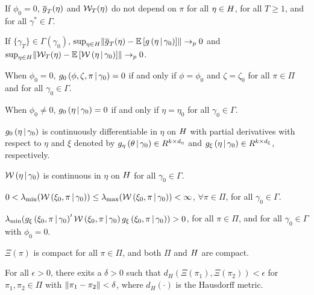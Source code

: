 \documentclass[11pt, letterpaper, twoside, final]{article}
\begin{document}
\begin{appendices}
    \begin{assump}[GMM 1]\label{ass:GMM1}
    \begin{assumplist}
        \item If $\phi_0=0$, $\sampmom(\eta)$ and $\W_{T}(\eta)$ do not depend on $\pi$ for all $\eta \in \Eta$,
            for all $T \geq 1$, and for all $\gamma^{*}\in \Gamma.$ 
            \label{ass:GMM1a}
        \item If $\lbrace \gamma_{T} \rbrace \in \Gamma\left(\gamma_0\right)$, $\sup_{\eta \in \Eta}
            \norm*{\sampmom(\eta) - \E\left[g\left(\eta \mvert \gamma_0\right)\right]} \pto 0$ and $\sup_{\eta
            \in \Eta} \norm{\W_{T}(\eta)-\E\left[\W\left(\eta \mvert \gamma_0\right)\right]} \pto 0$.
            \label{ass:GMM1b}
        \item When $\phi_0 = 0$,  $g_0\left(\phi, \zeta ,\pi \mvert \gamma_0\right) = 0$ if and only if $\phi
            =\phi_0$ and $\zeta = \zeta_0$ for all $\pi \in \Pi$ and for all $\gamma_0 \in \Gamma.$
            \label{ass:GMM1c}
        \item When $\phi_0 \neq 0$, $g_0\left(\eta \mvert \gamma_0\right)=0$ if and only if $\eta =\eta_0$ for all
            $\gamma_0 \in \Gamma.$
            \label{ass:GMM1d}
        \item  $g_0\left(\eta \mvert \gamma_0\right)$ is continuously differentiable in $\eta $ on $\Eta$ with
            partial derivatives with respect to $\eta$ and $\xi$ denoted by $g_{\eta}\left(\theta \mvert
            \gamma_0\right) \in R^{k\times d_{\eta }}$ and $g_{\xi }\left(\eta \mvert \gamma_0\right)\in R^{k\times
            d_{\xi }}$, respectively.
            \label{ass:GMM1e}
        \item $\W\left(\eta \mvert \gamma_0\right)$ is continuous in $\eta$ on $\Eta$ for all $\gamma_0\in
            \Gamma$.  \label{ass:GMM1f}
        \item $0 < \lambda_{\min}(\W\left(\xi_0, \pi \mvert \gamma_0\right))\leq \lambda_{\max }(\W\left(\xi_0,\pi
            \mvert \gamma_0\right)) < \infty$, $\forall \pi \in \Pi$, for all $\gamma_0 \in \Gamma$.
            \label{ass:GMM1g}
        \item $\lambda_{\min} (g_{\xi}\left(\xi_0,\pi \mvert \gamma_0\right)^{\prime} \W\left(\xi_0,\pi \mvert
            \gamma_0\right)g_{\xi }\left(\xi_0,\pi \mvert \gamma_0\right))>0$, for all $\pi \in \Pi$,  and for all 
            $\gamma_0 \in \Gamma$ with $\phi_0=0.$
            \label{ass:GMM1h}
        \item$\Xi(\pi)$ is compact for all $\pi \in \Pi$, and both $\Pi$ and $\Eta$ are compact.
            \label{ass:GMM1i}
        \item For all $\epsilon > 0$, there exits a $\delta > 0$ such that $d_{H}\left(\Xi \left(\pi_{1}\right),
            \Xi \left( \pi_{2}\right) \right) < \epsilon$ for $\pi_{1}, \pi_{2} \in \Pi$ with
            $\norm*{\pi_{1}-\pi_{2}} < \delta$, where $d_{H}\left( \cdot \right)$ is the Hausdorff metric.
            \label{ass:GMM1j}
    \end{assumplist}
    \end{assump}
    

\end{appendices}
\end{document}
